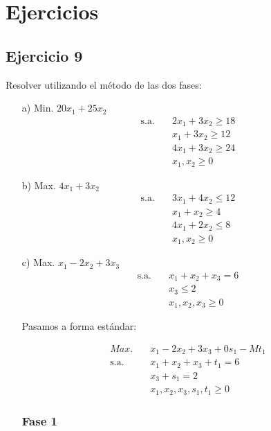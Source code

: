\section{Ejercicios}

\subsection*{Ejercicio 9}

Resolver utilizando el método de las dos fases:

\begin{itemize}
    \item[a)] Min. $20x_1 + 25x_2$
    \begin{align*}
        \text{s.a.} \quad & 2x_1 + 3x_2 \geq 18 \\
        & x_1 + 3x_2 \geq 12 \\
        & 4x_1 + 3x_2 \geq 24 \\
        & x_1, x_2 \geq 0
    \end{align*}

    
    \item[b)] Max. $4x_1 + 3x_2$
    \begin{align*}
        \text{s.a.} \quad & 3x_1 + 4x_2 \leq 12 \\
        & x_1 + x_2 \geq 4 \\
        & 4x_1 + 2x_2 \leq 8 \\
        & x_1, x_2 \geq 0
    \end{align*}
    
    \item[c)] Max. $x_1 - 2x_2 + 3x_3$
    \begin{align*}
        \text{s.a.} \quad & x_1 + x_2 + x_3 = 6 \\
        & x_3 \leq 2 \\
        & x_1, x_2, x_3 \geq 0
    \end{align*}

    Pasamos a forma estándar:

    \begin{align*}
        Max. \quad & x_1 - 2x_2 + 3x_3 + 0s_1 -Mt_1\\
        \text{s.a.} \quad & x_1 + x_2 + x_3 + t_1= 6 \\
        & x_3 + s_1 = 2 \\
        & x_1, x_2, x_3, s_1, t_1 \geq 0
    \end{align*}

    \subsubsection*{Fase 1}


\end{itemize}
